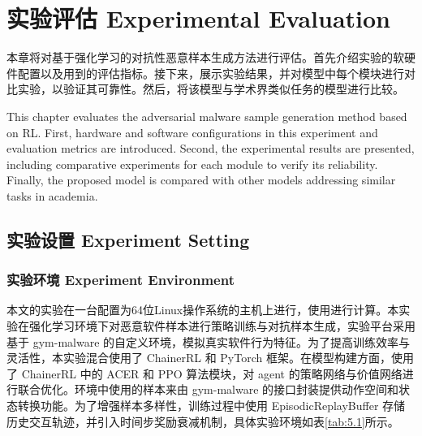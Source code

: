 %
%
%
%
%

\chapter{实验评估 Experimental Evaluation}

本章将对基于强化学习的对抗性恶意样本生成方法进行评估。首先介绍实验的软硬件配置以及用到的评估指标。接下来，展示实验结果，并对模型中每个模块进行对比实验，以验证其可靠性。然后，将该模型与学术界类似任务的模型进行比较。

This chapter evaluates the adversarial malware sample generation method based on RL. First, hardware and software configurations in this experiment and evaluation metrics are introduced. Second, the experimental results are presented, including comparative experiments for each module to verify its reliability. Finally, the proposed model is compared with other models addressing similar tasks in academia.

\section{实验设置 Experiment Setting}

\subsection{实验环境 Experiment Environment}

本文的实验在一台配置为64位Linux操作系统的主机上进行，使用进行计算。本实验在强化学习环境下对恶意软件样本进行策略训练与对抗样本生成，实验平台采用基于 gym-malware 的自定义环境，模拟真实软件行为特征。为了提高训练效率与灵活性，本实验混合使用了 ChainerRL 和 PyTorch 框架。在模型构建方面，使用了 ChainerRL 中的 ACER 和 PPO 算法模块，对 agent 的策略网络与价值网络进行联合优化。环境中使用的样本来由 gym-malware 的接口封装提供动作空间和状态转换功能。为了增强样本多样性，训练过程中使用 EpisodicReplayBuffer 存储历史交互轨迹，并引入时间步奖励衰减机制，具体实验环境如表\ref{tab:5.1}所示。

